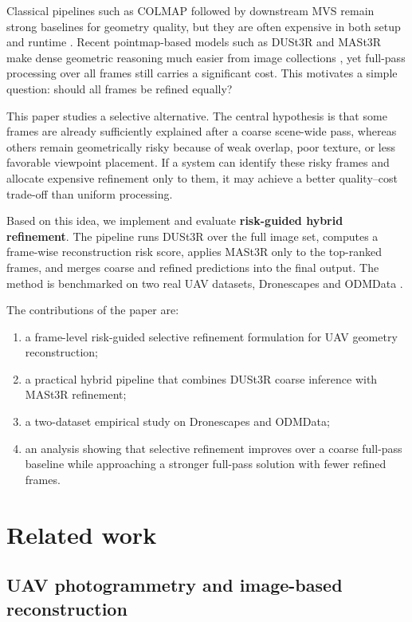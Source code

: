 \documentclass[preprint,12pt]{elsarticle}
\begin{document}
Classical pipelines such as COLMAP followed by downstream MVS remain strong baselines for geometry quality, but they are often expensive in both setup and runtime \citep{Schonberger2016SfM}. Recent pointmap-based models such as DUSt3R and MASt3R make dense geometric reasoning much easier from image collections \citep{Wang2024DUSt3R,Leroy2024MASt3R}, yet full-pass processing over all frames still carries a significant cost. This motivates a simple question: should all frames be refined equally?

This paper studies a selective alternative. The central hypothesis is that some frames are already sufficiently explained after a coarse scene-wide pass, whereas others remain geometrically risky because of weak overlap, poor texture, or less favorable viewpoint placement. If a system can identify these risky frames and allocate expensive refinement only to them, it may achieve a better quality--cost trade-off than uniform processing.

Based on this idea, we implement and evaluate \textbf{risk-guided hybrid refinement}. The pipeline runs DUSt3R over the full image set, computes a frame-wise reconstruction risk score, applies MASt3R only to the top-ranked frames, and merges coarse and refined predictions into the final output. The method is benchmarked on two real UAV datasets, Dronescapes \citep{DronescapesDataset} and ODMData \citep{ODMDataBenchmarks}.

The contributions of the paper are:
\begin{enumerate}[leftmargin=1.5em]
  \item a frame-level risk-guided selective refinement formulation for UAV geometry reconstruction;
  \item a practical hybrid pipeline that combines DUSt3R coarse inference with MASt3R refinement;
  \item a two-dataset empirical study on Dronescapes and ODMData;
  \item an analysis showing that selective refinement improves over a coarse full-pass baseline while approaching a stronger full-pass solution with fewer refined frames.
\end{enumerate}

\section{Related work}

\subsection{UAV photogrammetry and image-based reconstruction}
\end{document}
